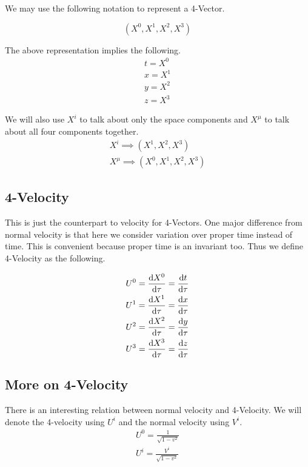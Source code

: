 \documentclass[12pt]{article}
\numberwithin{equation}{section}
\theoremstyle{plain}
\theoremstyle{definition}
\begin{document}
We may use the following notation to represent a 4-Vector.

\begin{equation}
    (X^0, X^1, X^2, X^3)
    \label{eq:4-vector}
\end{equation}

The above representation implies the following.
\begin{gather}
    t = X^0\\
    x = X^1\\
    y = X^2\\
    z = X^3
    \label{eq:4-vector-comps}
\end{gather}

We will also use $X^i$ to talk about only the space components and $X^\mu$ to talk about all four components together.
\begin{gather}
    X^i \implies (X^1, X^2, X^3)\\
    X^\mu \implies (X^0, X^1, X^2, X^3)
    \label{eq:4-vec-notation}
\end{gather}

\subsection{4-Velocity}

This is just the counterpart to velocity for 4-Vectors. One major difference from normal velocity is that here we consider variation over proper time instead of time. This is convenient because proper time is an invariant too. Thus we define 4-Velocity as the following.

\begin{gather}
    U^0 = \dv{X^0}{\tau} = \dv{t}{\tau}\\
    U^1 = \dv{X^1}{\tau} = \dv{x}{\tau}\\
    U^2 = \dv{X^2}{\tau} = \dv{y}{\tau}\\
    U^3 = \dv{X^3}{\tau} = \dv{z}{\tau}
    \label{eq:4-velocity}
\end{gather}

\subsection{More on 4-Velocity}

There is an interesting relation between normal velocity and 4-Velocity. We will denote the 4-velocity using $U^i$ and the normal velocity using $V^i$.
\begin{gather}
    U^0 = \frac{1}{\sqrt{1 - v^2}}\\
    U^i = \frac{V^i}{\sqrt{1 - v^2}}
    \label{4vel-normalvel}
\end{gather}
\end{document}
